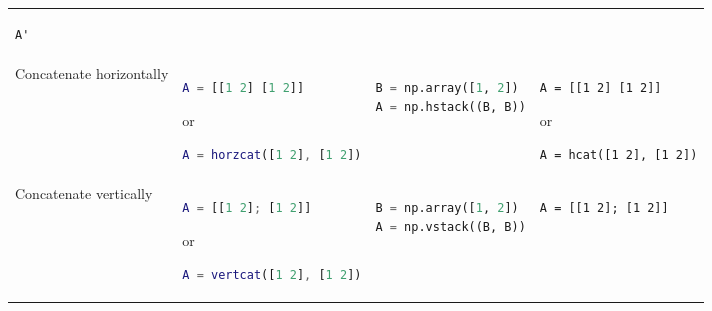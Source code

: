 \documentclass[10pt, landscape]{article}
\begin{document}
\begin{multicols}{2}
\begin{tabular}[]{@{}llll@{}}
\begin{minipage}[t]{0.20\columnwidth}
\begin{lstlisting}
A'
\end{lstlisting}
\strut
\end{minipage}\tabularnewline
\begin{minipage}[t]{0.24\columnwidth}\raggedright\strut
Concatenate horizontally\strut
\end{minipage} & \begin{minipage}[t]{0.23\columnwidth}\raggedright\strut
\begin{lstlisting}[language=Matlab]
A = [[1 2] [1 2]]
\end{lstlisting}

or

\begin{lstlisting}[language=Matlab]
A = horzcat([1 2], [1 2])
\end{lstlisting}
\strut
\end{minipage} & \begin{minipage}[t]{0.20\columnwidth}\raggedright\strut
\begin{lstlisting}[language=Python]
B = np.array([1, 2])
A = np.hstack((B, B))
\end{lstlisting}
\strut
\end{minipage} & \begin{minipage}[t]{0.20\columnwidth}\raggedright\strut
\begin{lstlisting}
A = [[1 2] [1 2]]
\end{lstlisting}

or

\begin{lstlisting}
A = hcat([1 2], [1 2])
\end{lstlisting}
\strut
\end{minipage}\tabularnewline
\begin{minipage}[t]{0.24\columnwidth}\raggedright\strut
Concatenate vertically\strut
\end{minipage} & \begin{minipage}[t]{0.23\columnwidth}\raggedright\strut
\begin{lstlisting}[language=Matlab]
A = [[1 2]; [1 2]]
\end{lstlisting}

or

\begin{lstlisting}[language=Matlab]
A = vertcat([1 2], [1 2])
\end{lstlisting}
\strut
\end{minipage} & \begin{minipage}[t]{0.20\columnwidth}\raggedright\strut
\begin{lstlisting}[language=Python]
B = np.array([1, 2])
A = np.vstack((B, B))
\end{lstlisting}
\strut
\end{minipage} & \begin{minipage}[t]{0.20\columnwidth}\raggedright\strut
\begin{lstlisting}
A = [[1 2]; [1 2]]
\end{lstlisting}


\end{minipage}
\end{tabular}
\end{multicols}
\end{document}

